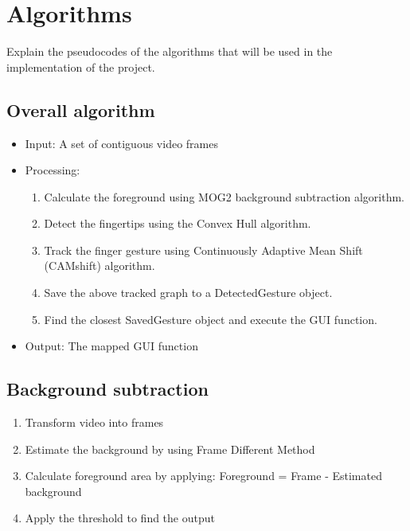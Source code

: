 \documentclass{scrreprt}
\begin{document}
\chapter{Algorithms}
Explain the pseudocodes of the algorithms that will be used in the implementation of the project.
\section{Overall algorithm}
\begin{itemize}
    \item Input: A set of contiguous video frames
    \item Processing:
    \begin{enumerate}
        \item Calculate the foreground using MOG2 background subtraction algorithm.
        \item Detect the fingertips using the Convex Hull algorithm.
        \item Track the finger gesture using Continuously Adaptive Mean Shift (CAMshift) algorithm.
        \item Save the above tracked graph to a DetectedGesture object.
        \item Find the closest SavedGesture object and execute the GUI function.
    \end{enumerate}
    \item Output: The mapped GUI function
\end{itemize}
\section{Background subtraction}
\begin{enumerate}
    \item Transform video into frames
    \item Estimate the background by using Frame Different Method
    \item Calculate foreground area by applying: Foreground = Frame - Estimated background
    \item Apply the threshold to find the output
\end{enumerate}
\end{document}
